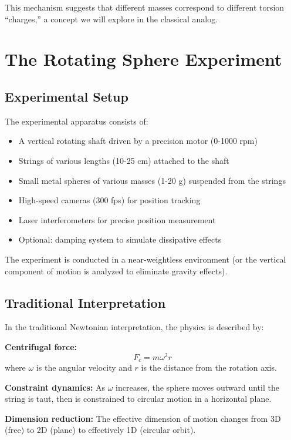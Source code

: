 \documentclass[UTF8]{ctex}\n\documentclass[12pt,a4paper]{article}
\begin{document}
This mechanism suggests that different masses correspond to different torsion ``charges,'' a concept we will explore in the classical analog.

\section{The Rotating Sphere Experiment}
\label{sec:experiment}

\subsection{Experimental Setup}

The experimental apparatus consists of:
\begin{itemize}
    \item A vertical rotating shaft driven by a precision motor (0-1000 rpm)
    \item Strings of various lengths (10-25 cm) attached to the shaft
    \item Small metal spheres of various masses (1-20 g) suspended from the strings
    \item High-speed cameras (300 fps) for position tracking
    \item Laser interferometers for precise position measurement
    \item Optional: damping system to simulate dissipative effects
\end{itemize}

The experiment is conducted in a near-weightless environment (or the vertical component of motion is analyzed to eliminate gravity effects).

\subsection{Traditional Interpretation}

In the traditional Newtonian interpretation, the physics is described by:

\textbf{Centrifugal force:}
\begin{equation}
    F_c = m\omega^2 r
\end{equation}
where $\omega$ is the angular velocity and $r$ is the distance from the rotation axis.

\textbf{Constraint dynamics:} As $\omega$ increases, the sphere moves outward until the string is taut, then is constrained to circular motion in a horizontal plane.

\textbf{Dimension reduction:} The effective dimension of motion changes from 3D (free) to 2D (plane) to effectively 1D (circular orbit).
\end{document}
